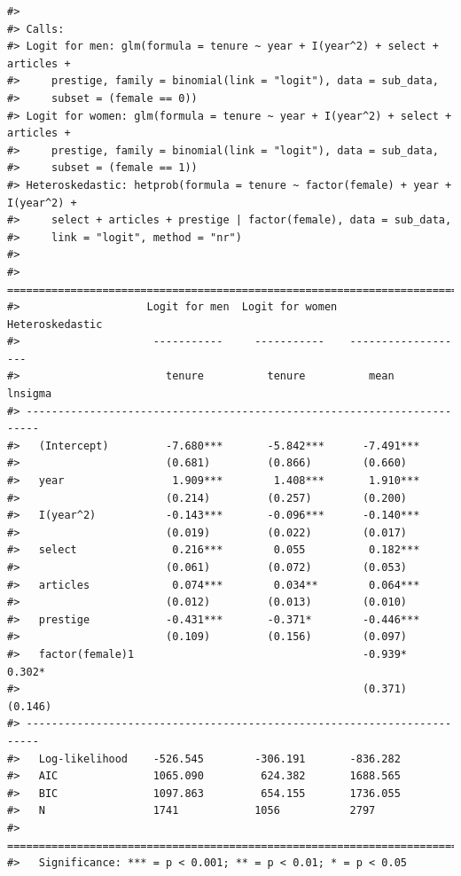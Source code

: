 \begin{verbatim}
#> 
#> Calls:
#> Logit for men: glm(formula = tenure ~ year + I(year^2) + select + articles + 
#>     prestige, family = binomial(link = "logit"), data = sub_data, 
#>     subset = (female == 0))
#> Logit for women: glm(formula = tenure ~ year + I(year^2) + select + articles + 
#>     prestige, family = binomial(link = "logit"), data = sub_data, 
#>     subset = (female == 1))
#> Heteroskedastic: hetprob(formula = tenure ~ factor(female) + year + I(year^2) + 
#>     select + articles + prestige | factor(female), data = sub_data, 
#>     link = "logit", method = "nr")
#> 
#> ========================================================================
#>                    Logit for men  Logit for women    Heteroskedastic    
#>                     -----------     -----------    -------------------  
#>                       tenure          tenure          mean     lnsigma  
#> ------------------------------------------------------------------------
#>   (Intercept)         -7.680***       -5.842***      -7.491***          
#>                       (0.681)         (0.866)        (0.660)            
#>   year                 1.909***        1.408***       1.910***          
#>                       (0.214)         (0.257)        (0.200)            
#>   I(year^2)           -0.143***       -0.096***      -0.140***          
#>                       (0.019)         (0.022)        (0.017)            
#>   select               0.216***        0.055          0.182***          
#>                       (0.061)         (0.072)        (0.053)            
#>   articles             0.074***        0.034**        0.064***          
#>                       (0.012)         (0.013)        (0.010)            
#>   prestige            -0.431***       -0.371*        -0.446***          
#>                       (0.109)         (0.156)        (0.097)            
#>   factor(female)1                                    -0.939*    0.302*  
#>                                                      (0.371)   (0.146)  
#> ------------------------------------------------------------------------
#>   Log-likelihood    -526.545        -306.191       -836.282             
#>   AIC               1065.090         624.382       1688.565             
#>   BIC               1097.863         654.155       1736.055             
#>   N                 1741            1056           2797                 
#> ========================================================================
#>   Significance: *** = p < 0.001; ** = p < 0.01; * = p < 0.05
\end{verbatim}

